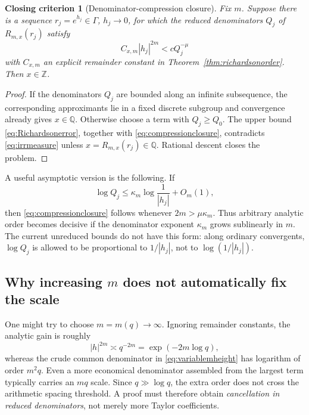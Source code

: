 \documentclass[11pt,oneside]{article}
\newtheorem{criterion}[theorem]{Closing criterion}
\theoremstyle{definition}
\theoremstyle{remark}
\newcommand{\Z}{\mathbb Z}
\newcommand{\Q}{\mathbb Q}
\begin{document}
\begin{criterion}[Denominator-compression closure]
\label{crit:compression}
Fix $m$.  Suppose there is a sequence $r_j=e^{h_j}\in\Gamma$, $h_j\to0$, for which the reduced
denominators $Q_j$ of $R_{m,x}(r_j)$ satisfy
\begin{equation}
 C_{x,m}|h_j|^{2m}<cQ_j^{-\mu}
 \label{eq:compressionclosure}
\end{equation}
with $C_{x,m}$ an explicit remainder constant in
Theorem~\ref{thm:richardsonorder}.  Then $x\in\Z$.
\end{criterion}

\begin{proof}
If the denominators $Q_j$ are bounded along an infinite subsequence, the corresponding
approximants lie in a fixed discrete subgroup and convergence already gives $x\in\Q$.
Otherwise choose a term with $Q_j\ge Q_0$.  The upper bound
\eqref{eq:Richardsonerror}, together with \eqref{eq:compressionclosure}, contradicts
\eqref{eq:irrmeasure} unless $x=R_{m,x}(r_j)\in\Q$.  Rational descent closes the problem.
\end{proof}

A useful asymptotic version is the following.  If
\begin{equation}
 \log Q_j\le\kappa_m\log\frac1{|h_j|}+O_m(1),
 \label{eq:polyheight}
\end{equation}
then \eqref{eq:compressionclosure} follows whenever $2m>\mu\kappa_m$.  Thus arbitrary analytic
order becomes decisive if the denominator exponent $\kappa_m$ grows sublinearly in $m$.
The current unreduced bounds do not have this form: along ordinary convergents,
$\log Q_j$ is allowed to be proportional to $1/|h_j|$, not to
$\log(1/|h_j|)$.

\subsection{Why increasing \texorpdfstring{$m$}{m} does not automatically fix the scale}

One might try to choose $m=m(q)\to\infty$.  Ignoring remainder constants, the analytic gain is
roughly
\[
 |h|^{2m}\asymp q^{-2m}=\exp(-2m\log q),
\]
whereas the crude common denominator in \eqref{eq:variablemheight} has logarithm of order
$m^2q$.  Even a more economical denominator assembled from the largest term typically carries
an $mq$ scale.  Since $q\gg\log q$, the extra order does not cross the arithmetic spacing
threshold.  A proof must therefore obtain \emph{cancellation in reduced denominators}, not
merely more Taylor coefficients.
\end{document}
